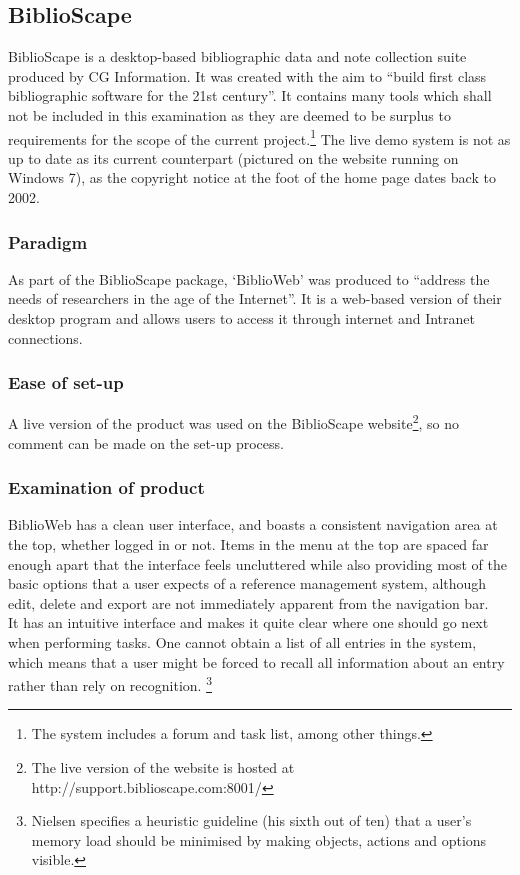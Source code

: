 \documentclass{l4proj}
\begin{document}
\subsection{BiblioScape}
BiblioScape is a desktop-based bibliographic data and note collection suite produced by CG Information.  It was created with the aim to ``build first class bibliographic software for the 21st century''.  It contains many tools which shall not be included in this examination as they are deemed to be surplus to requirements for the scope of the current project.\footnote{The system includes a forum and task list, among other things.} The live demo system is not as up to date as its current counterpart (pictured on the website running on Windows 7), as the copyright notice at the foot of the home page dates back to 2002.
\subsubsection{Paradigm}
As part of the BiblioScape package, `BiblioWeb' was produced to ``address the needs of researchers in the age of the Internet''.  It is a web-based version of their desktop program and allows users to access it through internet and Intranet connections.
\subsubsection{Ease of set-up}
A live version of the product was used on the BiblioScape website\footnote{The live version of the website is hosted at http://support.biblioscape.com:8001/}, so no comment can be made on the set-up process.
\subsubsection{Examination of product}
BiblioWeb has a clean user interface, and boasts a consistent navigation area at the top, whether logged in or not.  Items in the menu at the top are spaced far enough apart that the interface feels uncluttered while also providing most of the basic options that a user expects of a reference management system, although edit, delete and export are not immediately apparent from the navigation bar. \\

It has an intuitive interface and makes it quite clear where one should go next when performing tasks.  One cannot obtain a list of all entries in the system, which means that a user might be forced to recall all information about an entry rather than rely on recognition. \footnote{Nielsen specifies a heuristic guideline (his sixth out of ten) that a user's memory load should be minimised by making objects, actions and options visible.}\\
\end{document}
